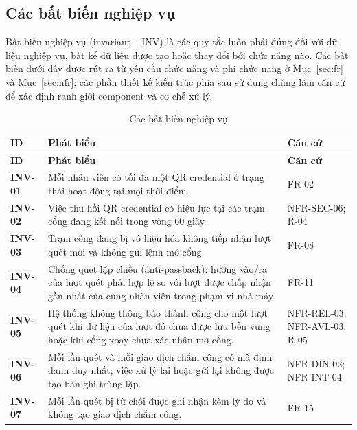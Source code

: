 \subsection{Các bất biến nghiệp vụ}\label{sec:invariants}
Bất biến nghiệp vụ (invariant -- INV) là các quy tắc luôn phải đúng đối với dữ liệu nghiệp vụ, bất kể dữ liệu được tạo hoặc thay đổi bởi chức năng nào. Các bất biến dưới đây được rút ra từ yêu cầu chức năng và phi chức năng ở Mục~\ref{sec:fr} và Mục~\ref{sec:nfr}; các phần thiết kế kiến trúc phía sau sử dụng chúng làm căn cứ để xác định ranh giới component và cơ chế xử lý.

\begingroup
\small
\renewcommand{\arraystretch}{1.2}
\begin{longtable}{|>{\centering\arraybackslash}m{1.4cm}|>{\raggedright\arraybackslash}m{10.4cm}|>{\raggedright\arraybackslash}m{3.6cm}|}
    \caption{Các bất biến nghiệp vụ}\label{tab:invariants}\\
    \hline
    \textbf{ID} & \textbf{Phát biểu} & \textbf{Căn cứ}\\
    \hline
    \endfirsthead
    \hline
    \textbf{ID} & \textbf{Phát biểu} & \textbf{Căn cứ}\\
    \hline
    \endhead
    \hline
    \endfoot
    \hline
    \endlastfoot
    \textbf{INV-01} & Mỗi nhân viên có tối đa một QR credential ở trạng thái hoạt động tại mọi thời điểm. & FR-02\\
    \hline
    \textbf{INV-02} & Việc thu hồi QR credential có hiệu lực tại các trạm cổng đang kết nối trong vòng 60 giây. & NFR-SEC-06; R-04\\
    \hline
    \textbf{INV-03} & Trạm cổng đang bị vô hiệu hóa không tiếp nhận lượt quét mới và không gửi lệnh mở cổng. & FR-08\\
    \hline
    \textbf{INV-04} & Chống quẹt lặp chiều (anti-passback): hướng vào/ra của lượt quét phải hợp lệ so với lượt được chấp nhận gần nhất của cùng nhân viên trong phạm vi nhà máy. & FR-11\\
    \hline
    \textbf{INV-05} & Hệ thống không thông báo thành công cho một lượt quét khi dữ liệu của lượt đó chưa được lưu bền vững hoặc khi cổng xoay chưa xác nhận mở cổng. & NFR-REL-03; NFR-AVL-03; R-05\\
    \hline
    \textbf{INV-06} & Mỗi lần quét và mỗi giao dịch chấm công có mã định danh duy nhất; việc xử lý lại hoặc gửi lại không được tạo bản ghi trùng lặp. & NFR-DIN-02; NFR-INT-04\\
    \hline
    \textbf{INV-07} & Mỗi lần quét bị từ chối được ghi nhận kèm lý do và không tạo giao dịch chấm công. & FR-15\\

\end{longtable}

